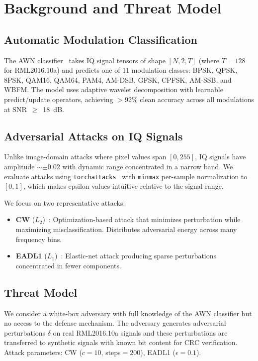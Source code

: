 \documentclass[letterpaper,twocolumn,10pt]{article}
\begin{document}
\section{Background and Threat Model}
\label{sec:background}

\subsection{Automatic Modulation Classification}

The AWN classifier~\cite{li2023awn} takes IQ signal tensors of shape
$[N, 2, T]$ (where $T{=}128$ for RML2016.10a) and predicts one of 11
modulation classes: BPSK, QPSK, 8PSK, QAM16, QAM64, PAM4, AM-DSB,
GFSK, CPFSK, AM-SSB, and WBFM. The model uses adaptive wavelet
decomposition with learnable predict/update operators, achieving
$>$92\% clean accuracy across all modulations at SNR~$\geq$~18~dB.

\subsection{Adversarial Attacks on IQ Signals}

Unlike image-domain attacks where pixel values span $[0, 255]$, IQ
signals have amplitude $\sim$$\pm$0.02 with dynamic range concentrated
in a narrow band. We evaluate attacks using \texttt{torchattacks}~\cite{kim2020torchattacks} with \texttt{minmax} per-sample
normalization to $[0, 1]$, which makes epsilon values intuitive
relative to the signal range.

We focus on two representative attacks:
\begin{itemize}
\item \textbf{CW} ($L_2$)~\cite{carlini2017towards}: Optimization-based
  attack that minimizes perturbation while maximizing misclassification.
  Distributes adversarial energy across many frequency bins.
\item \textbf{EADL1} ($L_1$)~\cite{chen2020ead}: Elastic-net attack
  producing sparse perturbations concentrated in fewer components.
\end{itemize}

\subsection{Threat Model}

We consider a white-box adversary with full knowledge of the AWN
classifier but no access to the defense mechanism. The adversary
generates adversarial perturbations $\delta$ on real RML2016.10a
signals and these perturbations are transferred to synthetic
signals with known bit content for CRC verification. Attack
parameters: CW ($c{=}10$, steps${=}200$), EADL1 ($\epsilon{=}0.1$).
\end{document}
